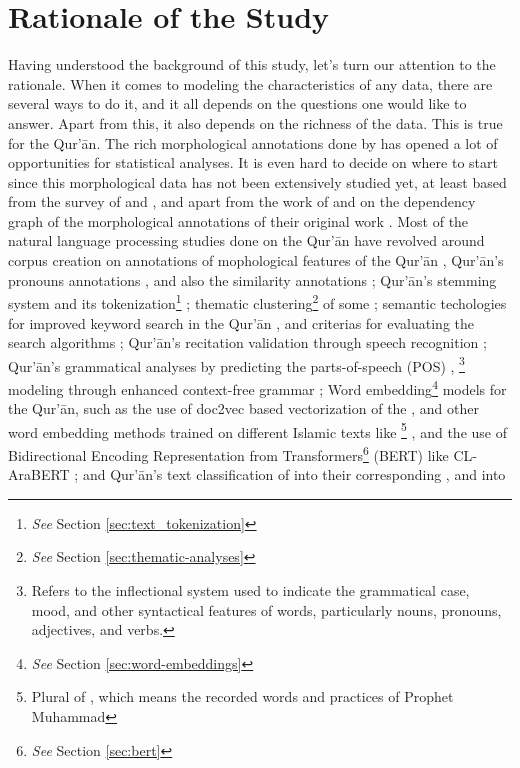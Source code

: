 \section{Rationale of the Study}\label{sec:rationale}
Having understood the background of this study, let's turn our attention to the rationale. When it comes to modeling the characteristics of any data, there are several ways to do it, and it all depends on the questions one would like to answer. Apart from this, it also depends on the richness of the data. This is true for the Qur'\=an. The rich morphological annotations done by  has opened a lot of opportunities for statistical analyses. It is even hard to decide on where to start since this morphological data has not been extensively studied yet, at least based from the survey of  and , and apart from the work of   and  on the dependency graph of the morphological annotations of their original work \cite{dukes-habash-2010-morphological}. Most of the natural language processing studies done on the Qur'\=an have revolved around corpus creation on annotations of mophological features of the Qur'\=an , Qur'\=an's pronouns annotations , and also the   similarity annotations ; Qur'\=an's stemming system  and its tokenization\footnote{\textit{See} Section \ref{sec:text_tokenization}} ; thematic clustering\footnote{\textit{See} Section \ref{sec:thematic-analyses}} of some   ; semantic techologies for improved keyword search in the Qur'\=an , and criterias for evaluating the search algorithms ; Qur'\=an's recitation validation through speech recognition ; Qur'\=an's grammatical analyses by predicting the parts-of-speech (POS) ,  \footnote{Refers to the inflectional system used to indicate the grammatical case, mood, and other syntactical features of words, particularly nouns, pronouns, adjectives, and verbs.} modeling through enhanced context-free grammar ; Word embedding\footnote{\textit{See} Section \ref{sec:word-embeddings}} models for the Qur'\=an, such as the use of doc2vec based vectorization of the   , and other word embedding methods trained on different Islamic texts like  \footnote{Plural of  , which means the recorded words and practices of Prophet Muhammad } , and the use of Bidirectional Encoding Representation from Transformers\footnote{\textit{See} Section \ref{sec:bert}} (BERT) like CL-AraBERT ; and Qur'\=an's text classification of   into their corresponding   , and into 